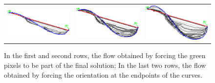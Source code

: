 \begin{figure}
\begin{tabular}{ccc}
\includegraphics[scale=0.25]{figures/chapter5/fixed-orientations/elastica/len_pen_0.1/curve-3/summary.pdf} &
\includegraphics[scale=0.25]{figures/chapter5/fixed-orientations/elastica/len_pen_0.01/curve-3/summary.pdf} &
\includegraphics[scale=0.25]{figures/chapter5/fixed-orientations/elastica/len_pen_0.001/curve-3/summary.pdf}
\end{tabular}
\caption{In the first and second rows, the flow obtained by forcing the green pixels to be part of the final solution; In the last two rows, the flow obtained by forcing the orientation at the endpoints of the curves.}
\label{fig:constrained-elastica}

\end{figure}

